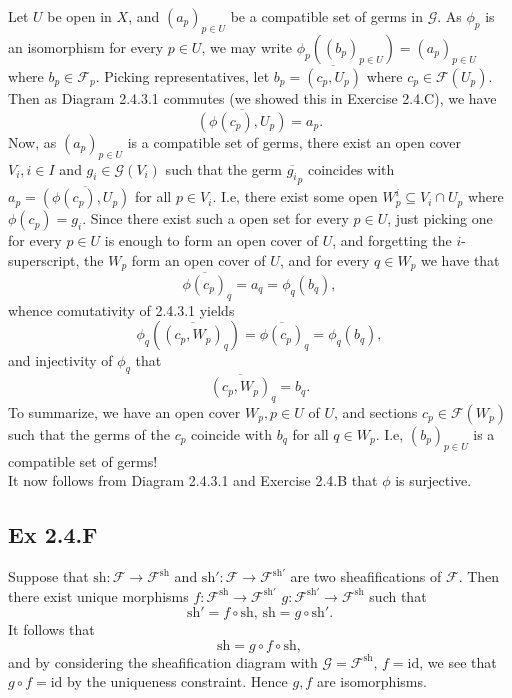\documentclass{article}
\theoremstyle{definition}
\newcommand{\id}{\text{id}}
\begin{document}
Let $U$ be open in $X$, and $(a_p)_{p \in U}$ be a compatible set of germs in
$\mathcal{G}$. As $\phi_p$ is an isomorphism for every $p \in U$, we may write
$\phi_p((b_p)_{p \in U}) = (a_p)_{p \in U}$ where $b_p \in \mathcal{F}_p$.
Picking representatives, let $b_p = \overline{(c_p, U_p)}$ where $c_p \in
	\mathcal{F}(U_p)$. Then as Diagram 2.4.3.1 commutes (we showed this in Exercise
2.4.C), we have
\[
	\overline{(\phi(c_p), U_p)}
	=
	a_p.
\]
Now, as $(a_p)_{p \in U}$ is a compatible set of germs, there exist an open
cover $V_i, i \in I$ and $g_i \in \mathcal{G}(V_i)$ such that the germ
$\overline{g_i}_p$ coincides with $a_p = \overline{(\phi(c_p), U_p)}$ for all
$p \in V_i$. I.e, there exist some open $W_{p}^{i} \subseteq V_i \cap U_p$
where $\phi(c_p) = g_i$. Since there exist such a open set for every $p \in U$,
just picking one for every $p \in U$ is enough to form an open cover of $U$,
and forgetting the $i$-superscript, the $W_p$ form an open cover of $U$, and
for every $q \in W_{p}$ we have that
\[
	\overline{\phi(c_p)}_q = a_q = \phi_q(b_q),
\]
whence comutativity of 2.4.3.1 yields
\[
	\phi_q(\overline{(c_p, W_p)}_q)
	=
	\overline{\phi(c_p)}_q
	=
	\phi_q(b_q),
\]
and injectivity of $\phi_q$ that
\[
	\overline{(c_p, W_p)}_q
	=
	b_q.
\]
To summarize, we have an open cover $W_{p}, p \in U$ of $U$, and sections $c_p
	\in \mathcal{F}(W_p)$ such that the germs of the $c_p$ coincide with $b_q$ for
all $q \in W_p$. I.e, $(b_p)_{p \in U}$ is a compatible set of germs! \\

It now follows from Diagram 2.4.3.1 and Exercise 2.4.B that $\phi$ is
surjective.

\subsection*{Ex 2.4.F}

Suppose that $\text{sh} : \mathcal{F} \to \mathcal{F}^{\text{sh}}$ and
$\text{sh}' : \mathcal{F} \to \mathcal{F}^{\text{sh}'}$ are two sheafifications
of $\mathcal{F}$. Then there exist unique morphisms $f :
	\mathcal{F}^{\text{sh}} \to \mathcal{F}^{\text{sh}'}$ $g :
	\mathcal{F}^{\text{sh}'} \to \mathcal{F}^{\text{sh}}$ such that
\[
	\text{sh}' = f \circ \text{sh}, \,
	\text{sh} = g \circ \text{sh}'.
\]
It follows that
\[
	\text{sh} = g \circ f \circ \text{sh},
\]
and by considering the sheafification diagram with $\mathcal{G} =
	\mathcal{F}^{\text{sh}}$, $f = \id$, we see that $g \circ f = \id$ by the
uniqueness constraint. Hence $g, f$ are isomorphisms.
\end{document}
